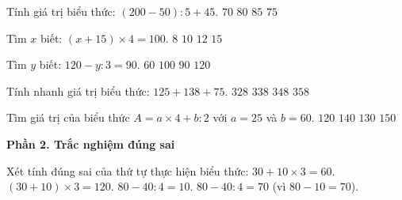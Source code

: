 \begin{ex} %
Tính giá trị biểu thức: $(200 - 50) : 5 + 45$.
\choice
{$70$}
{$80$}
{$85$}
{\True $75$}
\end{ex}

\begin{ex} %
Tìm $x$ biết: $(x + 15) \times 4 = 100$.
\choice
{$8$}
{\True $10$}
{$12$}
{$15$}
\end{ex}

\begin{ex} %
Tìm $y$ biết: $120 - y : 3 = 90$.
\choice
{$60$}
{$100$}
{\True $90$}
{$120$}
\end{ex}

\begin{ex} %
Tính nhanh giá trị biểu thức: $125 + 138 + 75$.
\choice
{$328$}
{\True $338$}
{$348$}
{$358$}
\end{ex}

\begin{ex} %
Tìm giá trị của biểu thức $A = a \times 4 + b : 2$ với $a = 25$ và $b = 60$.
\choice
{$120$}
{$140$}
{\True $130$}
{$150$}
\end{ex}

\textbf{Phần 2. Trắc nghiệm đúng sai}

\begin{ex} %
Xét tính đúng sai của thứ tự thực hiện biểu thức:
\choiceTF
{\True $30 + 10 \times 3 = 60$.}
{\True $(30 + 10) \times 3 = 120$.}
{$80 - 40 : 4 = 10$.}
{\True $80 - 40 : 4 = 70$ (vì $80 - 10 = 70$).}
\end{ex}

